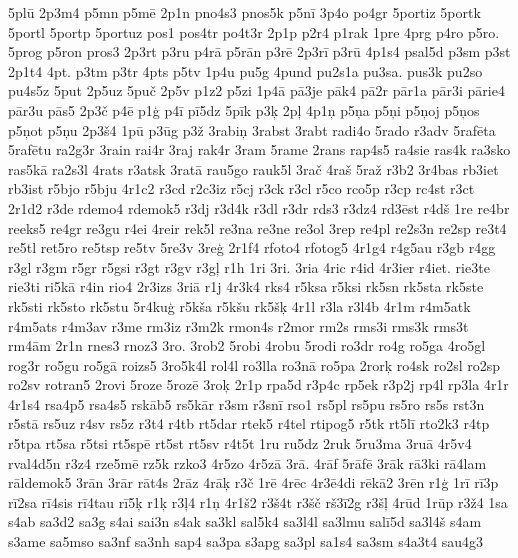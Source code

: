 {{5pl\={u} 2p3m4 p5mn p5m\={e} 2p1n pno4s3 pnos5k p5n\={i} 3p4o
po4gr 5portiz 5portk 5portl 5portp 5portuz pos1 pos4tr po4t3r 2p1p
p2r4 p1rak 1pre 4prg p4ro p5ro. 5prog p5ron pros3 2p3rt p3ru p4r\={a}
p5r\={a}n p3r\={e} 2p3r\={i} p3r\={u} 4p1s4 psal5d p3sm p3st
2p1t4 4pt. p3tm p3tr 4pts p5tv 1p4u pu5g 4pund pu2s1a pu3sa. pus3k pu2so
pu4s5z 5put 2p5uz 5pu\v{c} 2p5v p1z2 p5zi 1p4\={a} p\={a}3je p\={a}k4
p\={a}2r p\={a}r1a p\={a}r3i p\={a}rie4 p\={a}r3u p\={a}s5
2p3\v{c} p4\={e} p1\c{g} p4\={i} p\={i}5dz 5p\={i}k p3\c{k}
2p\c{l} 4p1\c{n} p5\c{n}a p5\c{n}i p5\c{n}oj p5\c{n}os p5\c{n}ot
p5\c{n}u 2p3\v{s}4 1p\={u} p3\={u}g p3\v{z} 3rabi\c{n} 3rabst
3rabt radi4o 5rado r3adv 5raf\={e}ta 5raf\={e}tu ra2g3r 3rain
rai4r 3raj rak4r 3ram 5rame 2rans rap4s5 ra4sie ras4k ra3sko ras5k\={a}
ra2s3l 4rats r3atsk 3rat\={a} rau5go rauk5l 3ra\v{c} 4ra\v{s}
5ra\v{z} r3b2 3r4bas rb3iet rb3ist r5bjo r5bju 4r1c2 r3cd r2c3iz
r5cj r3ck r3cl r5co rco5p r3cp rc4st r3ct 2r1d2 r3de rdemo4 rdemok5
r3dj r3d4k r3dl r3dr rds3 r3dz4 rd3\={e}st r4d\v{s} 1re re4br reeks5
re4gr re3gu r4ei 4reir rek5l re3na re3ne re3ol 3rep re4pl re2s3n
re2sp re3t4 re5tl ret5ro re5tsp re5tv 5re3v 3re\c{g} 2r1f4 rfoto4
rfotog5 4r1g4 r4g5au r3gb r4gg r3gl r3gm r5gr r5gsi r3gt r3gv r3g\c{l}
r1h 1ri 3ri. 3ria 4ric r4id 4r3ier r4iet. rie3te rie3ti ri5k\={a}
r4in rio4 2r3izs 3ri\={a} r1j 4r3k4 rks4 r5ksa r5ksi rk5sn rk5sta
rk5ste rk5sti rk5sto rk5stu 5r4ku\c{g} r5k\v{s}a r5k\v{s}u rk5\v{s}\c{k}
4r1l r3la r3l4b 4r1m r4m5atk r4m5ats r4m3av r3me rm3iz r3m2k
rmon4s r2mor rm2s rms3i rms3k rms3t rm4\={a}m 2r1n rnes3 rnoz3 3ro.
3rob2 5robi 4robu 5rodi ro3dr ro4g ro5ga 4ro5gl rog3r ro5gu ro5g\={a}
roizs5 3ro5k4l rol4l ro3lla ro3n\={a} ro5pa 2ror\c{k} ro4sk
ro2sl ro2sp ro2sv rotran5 2rovi 5roze 5roz\={e} 3ro\c{k} 2r1p rpa5d
r3p4c rp5ek r3p2j rp4l rp3la 4r1r 4r1s4 rsa4p5 rsa4s5 rsk\={a}b5
rs5k\={a}r r3sm r3sn\={i} rso1 rs5pl rs5pu rs5ro rs5s rst3n
r5st\={a} rs5uz r4sv rs5z r3t4 r4tb rt5dar rtek5 r4tel rtipog5 r5tk
rt5l\={i} rto2k3 r4tp r5tpa rt5sa r5tsi rt5sp\={e} rt5st rt5sv r4t5t
1ru ru5dz 2ruk 5ru3ma 3ru\={a} 4r5v4 rval4d5n r3z4 rze5m\={e} rz5k
rzko3 4r5zo 4r5z\={a} 3r\={a}. 4r\={a}f 5r\={a}f\={e} 3r\={a}k
r\={a}3ki r\={a}4lam r\={a}ldemok5 3r\={a}n 3r\={a}r r\={a}t4s
2r\={a}z 4r\={a}\c{k} r3\v{c} 1r\={e} 4r\={e}c 4r3\={e}4di
r\={e}k\={a}2 3r\={e}n r1\c{g} 1r\={i} r\={i}3p r\={i}2sa
r\={i}4sis r\={i}4tau r\={i}5\c{k} r1\c{k} r3\c{l}4 r1\c{n}
4r1\v{s}2 r3\v{s}4t r3\v{s}\v{c} r\v{s}3\={i}2g r3\v{s}\c{l}
4r\={u}d 1r\={u}p r3\v{z}4 1sa s4ab sa3d2 sa3g s4ai sai3n
s4ak sa3kl sal5k4 sa3l4l sa3lmu sal\={i}5d sa3l4\v{s} s4am s3ame
sa5mso sa3nf sa3nh sap4 sa3pa s3apg sa3pl sa1s4 sa3sm s4a3t4 sau4g3
}}
